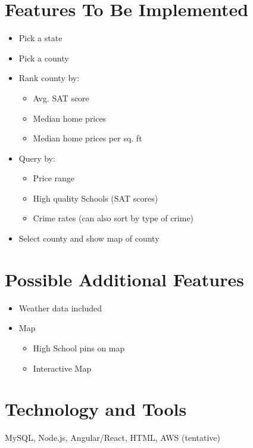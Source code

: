 \documentclass{article}
\begin{document}
\section*{Features To Be Implemented}
\begin{itemize}
    \item Pick a state
    \item Pick a county
    \item Rank county by:
    \begin{itemize}
        \item Avg. SAT score
        \item Median home prices
        \item Median home prices per sq. ft
    \end{itemize}
    \item Query by:
    \begin{itemize}
        \item Price range
        \item High quality Schools (SAT scores)
        \item Crime rates (can also sort by type of crime)
    \end{itemize}
    \item Select county and show map of county
\end{itemize}
\section*{Possible Additional Features}
\begin{itemize}
    \item Weather data included
    \item Map
    \begin{itemize}
        \item High School pins on map
        \item Interactive Map
    \end{itemize} 
\end{itemize}
\section*{Technology and Tools}
MySQL, Node.js, Angular/React, HTML, AWS (tentative)
\end{document}
